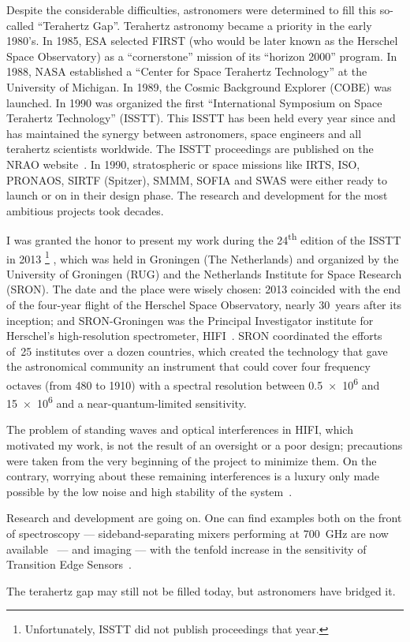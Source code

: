 Despite the considerable difficulties, astronomers were determined to fill this so-called ``Terahertz Gap''.
Terahertz astronomy became a priority in the early 1980's.
In 1985, ESA selected FIRST (who would be later known as the Herschel Space Observatory) as a ``cornerstone'' mission of its ``horizon 2000'' program.
In 1988, NASA established a ``Center for Space Terahertz Technology'' at the University of Michigan.
In 1989, the Cosmic Background Explorer (COBE) was launched.
In 1990 was organized the first ``International Symposium on Space Terahertz Technology'' (ISSTT).
This ISSTT has been held every year since and has maintained the synergy between astronomers, space engineers and all terahertz scientists worldwide.
The ISSTT proceedings are published on the NRAO website~\parencite{nrao:isstt}.
In 1990, stratospheric or space missions like IRTS, ISO, PRONAOS, SIRTF (Spitzer), SMMM, SOFIA and SWAS were either ready to launch or on in their design phase.
The research and development for the most ambitious projects took decades.

I was granted the honor to present my work during the 24\textsuperscript{th}
edition of the ISSTT in 2013%
\footnote{
    Unfortunately, ISSTT did not publish proceedings that year.
}%
, which was held in Groningen (The Netherlands) and organized by the University of Groningen (RUG) and the Netherlands Institute for Space Research (SRON).
The date and the place were wisely chosen:
2013 coincided with the end of the four-year flight of the Herschel Space Observatory, nearly \SI{30}{years} after its inception;
and SRON-Groningen was the Principal Investigator institute for Herschel's high-resolution spectrometer, HIFI~\parencite{AA_518_L6}.
SRON coordinated the efforts of~25 institutes over a dozen countries, which created the technology that gave the astronomical community an instrument that could cover four frequency octaves (from \num{480} to \SI{1910}{\gigahertz}) with a spectral resolution between \num{0.5e6} and \num{15e6} and a near-quantum-limited sensitivity.

The problem of standing waves and optical interferences in HIFI, which motivated my work, is not the result of an oversight or a poor design; precautions were taken from the very beginning of the project to minimize them.
On the contrary, worrying about these remaining interferences is a luxury only made possible by the low noise and high stability of the system~\parencite{AA_537_A17}.

Research and development are going on.
One can find examples both on the front of spectroscopy
--- sideband-separating mixers performing at \SI{700}{\giga\hertz} are now available~\parencite{khudchenko2011first} --- and imaging --- with the tenfold increase in the sensitivity of Transition Edge Sensors~\parencite{jackson2012spica}.


The terahertz gap may still not be filled today, but astronomers have bridged it.






